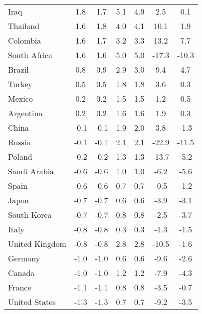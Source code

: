 \begin{tabular}[t]{lcccccc}
Iraq & 1.8 & 1.7 & 5.1 & 4.9 & 2.5 & 0.1\\
Thailand & 1.6 & 1.8 & 4.0 & 4.1 & 10.1 & 1.9\\
Colombia & 1.6 & 1.7 & 3.2 & 3.3 & 13.2 & 7.7\\
South Africa & 1.6 & 1.6 & 5.0 & 5.0 & -17.3 & -10.3\\
Brazil & 0.8 & 0.9 & 2.9 & 3.0 & 9.4 & 4.7\\
Turkey & 0.5 & 0.5 & 1.8 & 1.8 & 3.6 & 0.3\\
Mexico & 0.2 & 0.2 & 1.5 & 1.5 & 1.2 & 0.5\\
Argentina & 0.2 & 0.2 & 1.6 & 1.6 & 1.9 & 0.3\\
China & -0.1 & -0.1 & 1.9 & 2.0 & 3.8 & -1.3\\
Russia & -0.1 & -0.1 & 2.1 & 2.1 & -22.9 & -11.5\\
Poland & -0.2 & -0.2 & 1.3 & 1.3 & -13.7 & -5.2\\
Saudi Arabia & -0.6 & -0.6 & 1.0 & 1.0 & -6.2 & -5.6\\
Spain & -0.6 & -0.6 & 0.7 & 0.7 & -0.5 & -1.2\\
Japan & -0.7 & -0.7 & 0.6 & 0.6 & -3.9 & -3.1\\
South Korea & -0.7 & -0.7 & 0.8 & 0.8 & -2.5 & -3.7\\
Italy & -0.8 & -0.8 & 0.3 & 0.3 & -1.3 & -1.5\\
United Kingdom & -0.8 & -0.8 & 2.8 & 2.8 & -10.5 & -1.6\\
Germany & -1.0 & -1.0 & 0.6 & 0.6 & -9.6 & -2.6\\
Canada & -1.0 & -1.0 & 1.2 & 1.2 & -7.9 & -4.3\\
France & -1.1 & -1.1 & 0.8 & 0.8 & -3.5 & -0.7\\
United States & -1.3 & -1.3 & 0.7 & 0.7 & -9.2 & -3.5\\
\bottomrule
\end{tabular}